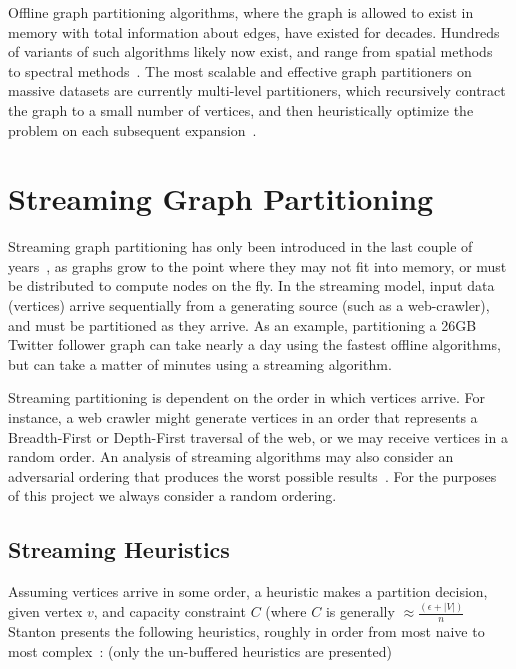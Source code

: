 \documentclass[11pt]{article}
\begin{document}

Offline graph partitioning algorithms, where the graph is allowed to exist in memory with total information about edges, have existed for decades. Hundreds of variants of such algorithms likely now exist, and range from spatial methods~\cite{Gilbert95geometricmesh} to spectral methods~\cite{arora2009expander}. The most scalable and effective graph partitioners on massive datasets are currently multi-level partitioners, which recursively contract the graph to a small number of vertices, and then heuristically optimize the problem on each subsequent expansion~\cite{karypis1998multilevel}. 

\section{Streaming Graph Partitioning}\vspace{-10 pt}
Streaming graph partitioning has only been introduced in the last couple of years~\cite{DBLP:journals/corr/abs-1212-1121,Stanton:2012:SGP:2339530.2339722,tsourakakis2012fennel}, as graphs grow to the point where they may not fit into memory, or must be distributed to compute nodes on the fly. In the streaming model, input data (vertices) arrive sequentially from a generating source (such as a web-crawler), and must be partitioned as they arrive. As an example, partitioning a 26GB Twitter follower graph can take nearly a day using the fastest offline algorithms, but can take a matter of minutes using a streaming algorithm.

Streaming partitioning is dependent on the order in which vertices arrive. For instance, a web crawler might generate vertices in an order that represents a Breadth-First or Depth-First traversal of the web, or we may receive vertices in a random order. An analysis of streaming algorithms may also consider an adversarial ordering that produces the worst possible results~\cite{Stanton:2012:SGP:2339530.2339722}. For the purposes of this project we always consider a random ordering. 

\subsection{Streaming Heuristics}
Assuming vertices arrive in some order, a heuristic makes a partition decision, given vertex $v$, and capacity constraint $C$ (where $C$ is generally $\approx \frac{(\epsilon+|V|)}{n}$ Stanton presents the following heuristics, roughly in order from most naive to most complex~\cite{Stanton:2012:SGP:2339530.2339722}: (only the un-buffered heuristics are presented)
\end{document}

